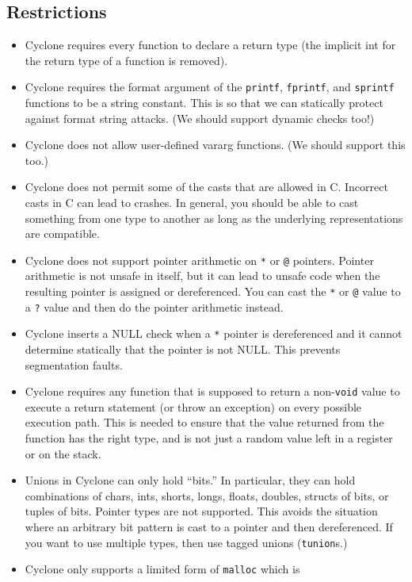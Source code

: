 \subsection{Restrictions}
\begin{itemize}
\item Cyclone requires every function to declare a return type (the
  implicit int for the return type of a function is removed).
\item Cyclone requires the format argument of the \texttt{printf},
  \texttt{fprintf}, and \texttt{sprintf} functions to be a string
  constant.  This is so that we can statically protect against format
  string attacks.  (We should support dynamic checks too!)
\item Cyclone does not allow user-defined vararg functions. (We should
  support this too.)
\item Cyclone does not permit some of the casts that are allowed in C\@.
  Incorrect casts in C can lead to crashes.  In general, you should be
  able to cast something from one type to another as long as the
  underlying representations are compatible.
\item Cyclone does not support pointer arithmetic on \texttt{*} or
  \texttt{@} pointers.  Pointer arithmetic is not unsafe in itself, but
  it can lead to unsafe code when the resulting pointer is assigned or
  dereferenced.  You can cast the \texttt{*} or \texttt{@} value to a
  \texttt{?} value and then do the pointer arithmetic instead.
\item Cyclone inserts a NULL check when a \texttt{*} pointer is
  dereferenced and it cannot determine statically that the pointer is
  not NULL\@.  This prevents segmentation faults.
\item Cyclone requires any function that is supposed to return a
  non-\texttt{void} value to execute a return statement (or throw an
  exception) on every possible execution path. This is needed to
  ensure that the value returned from the function has the right type,
  and is not just a random value left in a register or on the stack.
\item Unions in Cyclone can only hold ``bits.''  In particular, they
  can hold combinations of chars, ints, shorts, longs, floats,
  doubles, structs of bits, or tuples of bits. Pointer types are not
  supported.  This avoids the situation where an arbitrary bit pattern
  is cast to a pointer and then dereferenced. If you want to use
  multiple types, then use tagged unions (\texttt{tunion}s.)
\item Cyclone only supports a limited form of \texttt{malloc} which is

\end{itemize}
